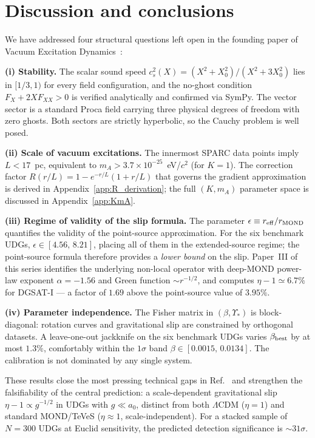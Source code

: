\documentclass[aps,prd,reprint,floatfix,nofootinbib,superscriptaddress]{revtex4-2}
\newcommand{\aO}{a_0}
\begin{document}
\section{Discussion and conclusions}
\label{sec:conclusions}

We have addressed four structural questions left open in the
founding paper of Vacuum Excitation Dynamics~\cite{Mendes2026}:

\textbf{(i) Stability.} The scalar sound speed
$c_s^2(X) = (X^2 + X_0^2)/(X^2 + 3 X_0^2)$ lies in
$[1/3,1)$ for every field configuration, and the no-ghost
condition $F_X + 2X F_{XX} > 0$ is verified analytically and
confirmed via SymPy. The vector sector is a standard Proca
field carrying three physical degrees of freedom with zero
ghosts. Both sectors are strictly hyperbolic, so the Cauchy
problem is well posed.

\textbf{(ii) Scale of vacuum excitations.} The innermost SPARC
data points imply $L<17$~pc, equivalent to
$m_A > 3.7\times10^{-25}$~eV/$c^2$ (for $K=1$).
The correction factor $R(r/L) = 1 - e^{-r/L}(1 + r/L)$ that
governs the gradient approximation is derived in
Appendix~\ref{app:R_derivation}; the full $(K, m_A)$ parameter
space is discussed in Appendix~\ref{app:KmA}.

\textbf{(iii) Regime of validity of the slip formula.} The
parameter $\epsilon\equiv r_{\rm eff}/r_{\rm MOND}$ quantifies
the validity of the point-source approximation. For the six
benchmark UDGs, $\epsilon\in[4.56,\,8.21]$, placing all of them
in the extended-source regime; the point-source formula
therefore provides a \emph{lower bound} on the slip.
Paper~III of this series identifies the underlying non-local
operator with deep-MOND power-law exponent
$\alpha = -1.56$ and Green function $\sim r^{-1/2}$, and
computes $\eta - 1 \simeq 6.7\%$ for DGSAT-I --- a factor of
$1.69$ above the point-source value of $3.95\%$.

\textbf{(iv) Parameter independence.} The Fisher matrix in
$(\beta,\Upsilon_*)$ is block-diagonal: rotation curves and
gravitational slip are constrained by orthogonal datasets.
A leave-one-out jackknife on the six benchmark UDGs varies
$\beta_{\rm best}$ by at most $1.3\%$, comfortably within the
$1\sigma$ band $\beta\in[0.0015,\,0.0134]$. The calibration is
not dominated by any single system.

These results close the most pressing technical gaps in
Ref.~\cite{Mendes2026} and strengthen the falsifiability of
the central prediction: a scale-dependent gravitational slip
$\eta-1\propto g^{-1/2}$ in UDGs with $g\ll\aO$, distinct from
both $\Lambda$CDM ($\eta = 1$) and standard MOND/TeVeS
($\eta\approx 1$, scale-independent). For a stacked sample of
$N=300$ UDGs at Euclid sensitivity, the predicted detection
significance is ${\sim}31\sigma$.
\end{document}
